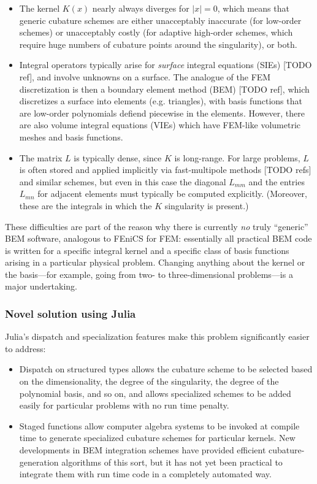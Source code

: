 \begin{itemize}
\item The kernel $K(x)$ nearly always diverges for $|x|=0$, which means that generic
cubature schemes are either unacceptably inaccurate (for low-order schemes) or
unacceptably costly (for adaptive high-order schemes, which require huge numbers
of cubature points around the singularity), or both.

\item Integral operators typically arise for \emph{surface} integral
equations (SIEs) [TODO ref], and involve unknowns on a surface.
The analogue of the FEM discretization is then a boundary element method
(BEM) [TODO ref], which discretizes a surface into elements
(e.g. triangles), with basis functions that are low-order
polynomials defiend piecewise in the elements.
However, there are also volume integral equations (VIEs) which have FEM-like
volumetric meshes and basis functions.

\item The matrix $L$ is typically dense, since $K$ is long-range.
For large problems, $L$ is often stored and applied implicitly via
fast-multipole methods [TODO refs] and similar schemes, but even in this
case the diagonal $L_{mm}$ and the entries $L_{mn}$ for adjacent
elements must typically be computed explicitly.
(Moreover, these are the integrals in which the $K$ singularity is present.)
\end{itemize}

These difficulties are part of the reason why there is currently \emph{no}
truly ``generic'' BEM software, analogous to FEniCS for FEM: essentially
all practical BEM code is written for a specific integral kernel and
a specific class of basis functions arising in a particular physical problem.
Changing anything about the kernel or the basis---for example, going
from two- to three-dimensional problems---is a major undertaking.

\subsubsection{Novel solution using Julia}

Julia's dispatch and specialization features make this problem
significantly easier to address:

\begin{itemize}
\item Dispatch on structured types allows the cubature scheme to be selected %
based on the dimensionality, the degree of the singularity, the degree of
the polynomial basis, and so on, and allows specialized schemes to be added
easily for particular problems with no run time penalty.

\item Staged functions allow computer algebra systems to be invoked at
compile time to generate specialized cubature schemes for particular
kernels.
New developments in BEM integration schemes \cite{ReidWhJo14} have
provided efficient cubature-generation algorithms of this sort, but it
has not yet been practical to integrate them with run time code in
a completely automated way.
\end{itemize}

